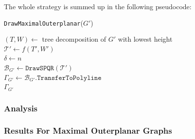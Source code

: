 The whole strategy is summed up in the following pseudocode:\\
\begin{algorithm}[H]
	\caption{\texttt{DrawMaximalOuterplanar}($G'$)}\label{al:maximal_outerplanar_two_bends}
	$(T,W) \gets$ tree decomposition of $G'$ with lowest height\\
	$\mathcal{T'} \gets f(T',W')$\\
	$\delta \gets n$\\
	$\mathcal{B}_{G'} \gets \texttt{DrawSPQR}(\mathcal{T'})$\\
	$\Gamma_{G'} \gets \mathcal{B}_{G'}.\texttt{TransferToPolyline}$\\
	\Return $\Gamma_{G'}$
\end{algorithm}

\subsubsection{Analysis}



\subsubsection{Results For Maximal Outerplanar Graphs}

